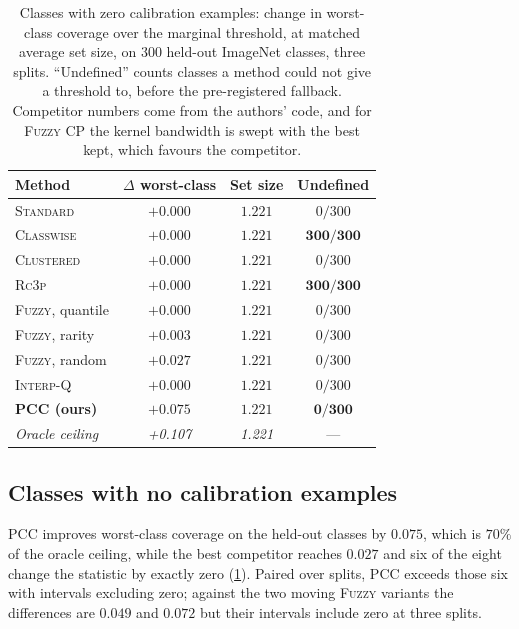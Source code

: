 \begin{table}[t]
\centering
\small
\setlength{\tabcolsep}{4pt}
\begin{tabular}{lccc}
\toprule
Method & $\Delta$ worst-class & Set size & Undefined \\
\midrule
\textsc{Standard} \cite{vovk2005algorithmic}   & $+0.000$ & $1.221$ & $0/300$ \\
\textsc{Classwise} \cite{sadinle2019least}     & $+0.000$ & $1.221$ & $\mathbf{300/300}$ \\
\textsc{Clustered} \cite{ding2023class}        & $+0.000$ & $1.221$ & $0/300$ \\
\textsc{Rc3p} \cite{shi2024rank}               & $+0.000$ & $1.221$ & $\mathbf{300/300}$ \\
\textsc{Fuzzy}, quantile \cite{ding2026conformal} & $+0.000$ & $1.221$ & $0/300$ \\
\textsc{Fuzzy}, rarity \cite{ding2026conformal}   & $+0.003$ & $1.221$ & $0/300$ \\
\textsc{Fuzzy}, random \cite{ding2026conformal}   & $+0.027$ & $1.221$ & $0/300$ \\
\textsc{Interp-Q} \cite{ding2026conformal}        & $+0.000$ & $1.221$ & $0/300$ \\
\midrule
\textbf{PCC (ours)} & $\mathbf{+0.075}$ & $1.221$ & $\mathbf{0/300}$ \\
\midrule
\textit{Oracle ceiling} & \textit{+0.107} & \textit{1.221} & --- \\
\bottomrule
\end{tabular}
\caption{Classes with zero calibration examples: change in worst-class coverage over the
marginal threshold, at matched average set size, on $300$ held-out ImageNet classes, three
splits. ``Undefined'' counts classes a method could not give a threshold to, before the
pre-registered fallback. Competitor numbers come from the authors' code, and for
\textsc{Fuzzy} CP the kernel bandwidth is swept with the best kept, which favours the
competitor.}
\label{tab:competitors}
\end{table}

\subsection{Classes with no calibration examples}
\label{sec:comp}

PCC improves worst-class coverage on the held-out classes by $0.075$, which is $70\%$ of the
oracle ceiling, while the best competitor reaches $0.027$ and six of the eight change the
statistic by exactly zero (\cref{tab:competitors}). Paired over splits, PCC exceeds those six
with intervals excluding zero; against the two moving \textsc{Fuzzy} variants the differences
are $0.049$ and $0.072$ but their intervals include zero at three splits.


